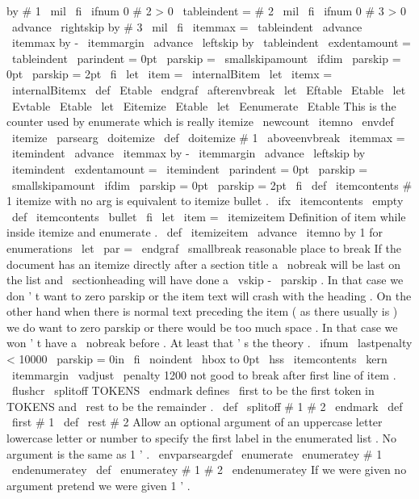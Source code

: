 {{by
#
1
\
mil
\
fi
\
ifnum
0
#
2
>
0
\
tableindent
=
#
2
\
mil
\
fi
\
ifnum
0
#
3
>
0
\
advance
\
rightskip
by
#
3
\
mil
\
fi
\
itemmax
=
\
tableindent
\
advance
\
itemmax
by
-
\
itemmargin
\
advance
\
leftskip
by
\
tableindent
\
exdentamount
=
\
tableindent
\
parindent
=
0pt
\
parskip
=
\
smallskipamount
\
ifdim
\
parskip
=
0pt
\
parskip
=
2pt
\
fi
\
let
\
item
=
\
internalBitem
\
let
\
itemx
=
\
internalBitemx
}
\
def
\
Etable
{
\
endgraf
\
afterenvbreak
}
\
let
\
Eftable
\
Etable
\
let
\
Evtable
\
Etable
\
let
\
Eitemize
\
Etable
\
let
\
Eenumerate
\
Etable
%
This
is
the
counter
used
by
enumerate
which
is
really
itemize
\
newcount
\
itemno
\
envdef
\
itemize
{
\
parsearg
\
doitemize
}
\
def
\
doitemize
#
1
{
%
\
aboveenvbreak
\
itemmax
=
\
itemindent
\
advance
\
itemmax
by
-
\
itemmargin
\
advance
\
leftskip
by
\
itemindent
\
exdentamount
=
\
itemindent
\
parindent
=
0pt
\
parskip
=
\
smallskipamount
\
ifdim
\
parskip
=
0pt
\
parskip
=
2pt
\
fi
\
def
\
itemcontents
{
#
1
}
%
%
itemize
with
no
arg
is
equivalent
to
itemize
bullet
.
\
ifx
\
itemcontents
\
empty
\
def
\
itemcontents
{
\
bullet
}
\
fi
\
let
\
item
=
\
itemizeitem
}
%
Definition
of
item
while
inside
itemize
and
enumerate
.
%
\
def
\
itemizeitem
{
%
\
advance
\
itemno
by
1
%
for
enumerations
{
\
let
\
par
=
\
endgraf
\
smallbreak
}
%
reasonable
place
to
break
{
%
%
If
the
document
has
an
itemize
directly
after
a
section
title
a
%
\
nobreak
will
be
last
on
the
list
and
\
sectionheading
will
have
%
done
a
\
vskip
-
\
parskip
.
In
that
case
we
don
'
t
want
to
zero
%
parskip
or
the
item
text
will
crash
with
the
heading
.
On
the
%
other
hand
when
there
is
normal
text
preceding
the
item
(
as
there
%
usually
is
)
we
do
want
to
zero
parskip
or
there
would
be
too
much
%
space
.
In
that
case
we
won
'
t
have
a
\
nobreak
before
.
At
least
%
that
'
s
the
theory
.
\
ifnum
\
lastpenalty
<
10000
\
parskip
=
0in
\
fi
\
noindent
\
hbox
to
0pt
{
\
hss
\
itemcontents
\
kern
\
itemmargin
}
%
\
vadjust
{
\
penalty
1200
}
}
%
not
good
to
break
after
first
line
of
item
.
\
flushcr
}
%
\
splitoff
TOKENS
\
endmark
defines
\
first
to
be
the
first
token
in
%
TOKENS
and
\
rest
to
be
the
remainder
.
%
\
def
\
splitoff
#
1
#
2
\
endmark
{
\
def
\
first
{
#
1
}
\
def
\
rest
{
#
2
}
}
%
%
Allow
an
optional
argument
of
an
uppercase
letter
lowercase
letter
%
or
number
to
specify
the
first
label
in
the
enumerated
list
.
No
%
argument
is
the
same
as
1
'
.
%
\
envparseargdef
\
enumerate
{
\
enumeratey
#
1
\
endenumeratey
}
\
def
\
enumeratey
#
1
#
2
\
endenumeratey
{
%
%
If
we
were
given
no
argument
pretend
we
were
given
1
'
.
\
}}
